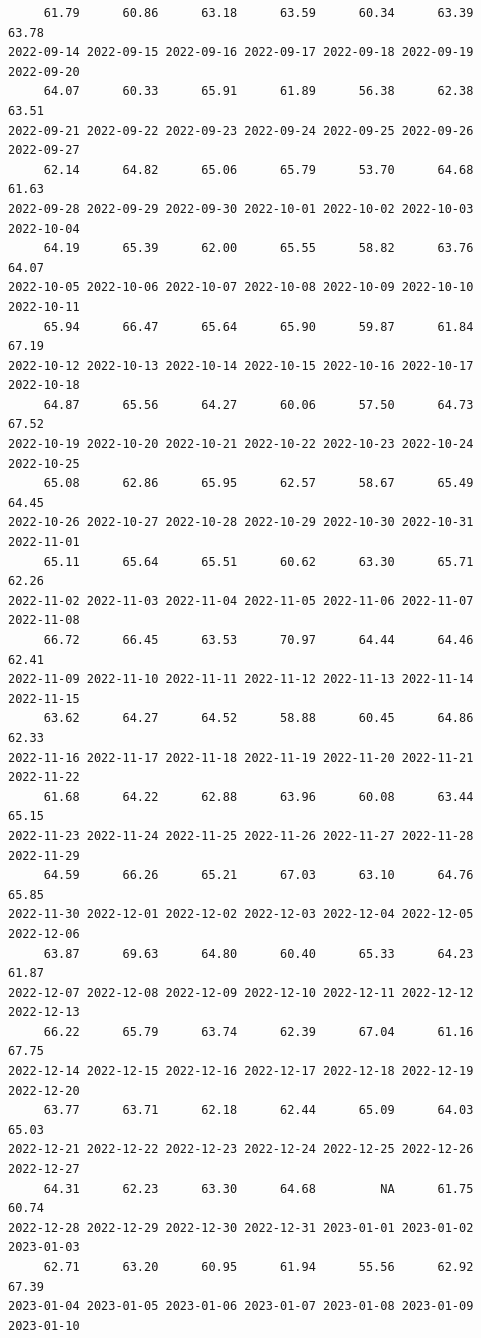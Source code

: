 \documentclass[
  letterpaper,
  DIV=11,
  numbers=noendperiod]{scrartcl}
\begin{document}
\begin{verbatim}
     61.79      60.86      63.18      63.59      60.34      63.39      63.78 
2022-09-14 2022-09-15 2022-09-16 2022-09-17 2022-09-18 2022-09-19 2022-09-20 
     64.07      60.33      65.91      61.89      56.38      62.38      63.51 
2022-09-21 2022-09-22 2022-09-23 2022-09-24 2022-09-25 2022-09-26 2022-09-27 
     62.14      64.82      65.06      65.79      53.70      64.68      61.63 
2022-09-28 2022-09-29 2022-09-30 2022-10-01 2022-10-02 2022-10-03 2022-10-04 
     64.19      65.39      62.00      65.55      58.82      63.76      64.07 
2022-10-05 2022-10-06 2022-10-07 2022-10-08 2022-10-09 2022-10-10 2022-10-11 
     65.94      66.47      65.64      65.90      59.87      61.84      67.19 
2022-10-12 2022-10-13 2022-10-14 2022-10-15 2022-10-16 2022-10-17 2022-10-18 
     64.87      65.56      64.27      60.06      57.50      64.73      67.52 
2022-10-19 2022-10-20 2022-10-21 2022-10-22 2022-10-23 2022-10-24 2022-10-25 
     65.08      62.86      65.95      62.57      58.67      65.49      64.45 
2022-10-26 2022-10-27 2022-10-28 2022-10-29 2022-10-30 2022-10-31 2022-11-01 
     65.11      65.64      65.51      60.62      63.30      65.71      62.26 
2022-11-02 2022-11-03 2022-11-04 2022-11-05 2022-11-06 2022-11-07 2022-11-08 
     66.72      66.45      63.53      70.97      64.44      64.46      62.41 
2022-11-09 2022-11-10 2022-11-11 2022-11-12 2022-11-13 2022-11-14 2022-11-15 
     63.62      64.27      64.52      58.88      60.45      64.86      62.33 
2022-11-16 2022-11-17 2022-11-18 2022-11-19 2022-11-20 2022-11-21 2022-11-22 
     61.68      64.22      62.88      63.96      60.08      63.44      65.15 
2022-11-23 2022-11-24 2022-11-25 2022-11-26 2022-11-27 2022-11-28 2022-11-29 
     64.59      66.26      65.21      67.03      63.10      64.76      65.85 
2022-11-30 2022-12-01 2022-12-02 2022-12-03 2022-12-04 2022-12-05 2022-12-06 
     63.87      69.63      64.80      60.40      65.33      64.23      61.87 
2022-12-07 2022-12-08 2022-12-09 2022-12-10 2022-12-11 2022-12-12 2022-12-13 
     66.22      65.79      63.74      62.39      67.04      61.16      67.75 
2022-12-14 2022-12-15 2022-12-16 2022-12-17 2022-12-18 2022-12-19 2022-12-20 
     63.77      63.71      62.18      62.44      65.09      64.03      65.03 
2022-12-21 2022-12-22 2022-12-23 2022-12-24 2022-12-25 2022-12-26 2022-12-27 
     64.31      62.23      63.30      64.68         NA      61.75      60.74 
2022-12-28 2022-12-29 2022-12-30 2022-12-31 2023-01-01 2023-01-02 2023-01-03 
     62.71      63.20      60.95      61.94      55.56      62.92      67.39 
2023-01-04 2023-01-05 2023-01-06 2023-01-07 2023-01-08 2023-01-09 2023-01-10 

\end{verbatim}
\end{document}
